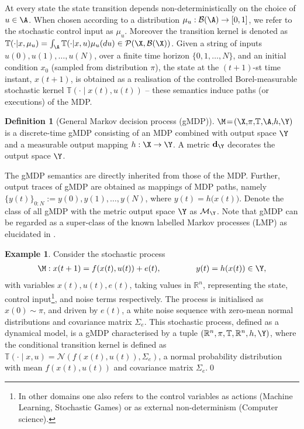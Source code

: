 \documentclass[letterpaper, 10 pt, conference]{amsart}
\theoremstyle{definition}
\newtheorem{defn}[definition]{Definition}
\theoremstyle{example}
\newtheorem{example}{Example}
\theoremstyle{remark}
\begin{document}
At every state the state transition depends non-deterministically on the choice of $u\in \A$.  
When chosen according to 
a distribution  $\mu_u:\mathcal{B}(\A)\rightarrow [0,1]$, we refer to the stochastic control input as $\mu_u$. Moreover   
the transition kernel is denoted as $\mathbb T(\cdot| x, \mu_u)=\int_\A \mathbb T(\cdot| x, u) \mu_u(du)\in \mathcal P(\X,\mathcal B(\X))$. 
Given a string of inputs $u(0), u(1), \ldots, u(N)$,  
over a finite time horizon $\{0,1,\ldots, N\}$, 
and an initial condition  $x_0$ (sampled from distribution $\pi$), 
the state at the $(t+1)$-st time instant, $x(t+1)$,
is obtained as a realisation of the controlled Borel-measurable stochastic kernel $\mathbb{T}\left(\cdot\mid x(t), u(t) \right)$ -- 
these semantics induce paths (or executions) of the MDP.   
\begin{defn}[General Markov decision process (gMDP)] 
$\M\!=\!(\X,\!\pi,\!\mathbb T,\!\A,\!h,\! \Y)$ is a discrete-time gMDP consisting of an MDP combined with output space $\Y$ and a measurable output mapping $h:\X\rightarrow\Y$.   
A metric $\mathbf d_\Y$ decorates the output space $\Y$.  \end{defn}
The gMDP semantics are directly inherited from those of the MDP. 
Further, output traces of gMDP are obtained as mappings of MDP paths, namely 
$\{y(t)\}_{0:N}:= y(0), y(1), \ldots, y(N)$, 
where $y(t) = h\big(x(t)\big)$. Denote the 
class of all gMDP with the metric output space $\Y$ as $\mathcal{M}_\Y$. Note that gMDP 
can be regarded as a super-class of the known labelled Markov processes (LMP) \cite{desharnais2004metrics} as elucidated in \cite{bcAKNP14}. 
\begin{example}\label{ex11}
Consider the stochastic process \begin{align*}\textstyle \M:  
x(t+1)=f(x(t),u(t))+ e(t),\hspace{1.5cm} y(t)=h(x(t))\in\Y,
\end{align*}
with variables $ x(t), u(t), e(t)$, 
taking values in $\mathbb R^n$, 
representing the state, control input\footnote{ In other domains one also refers to the control variables as actions (Machine Learning, Stochastic Games) or as external non-determinism (Computer science).}, and noise
terms respectively. 
The process is initialised as $x(0) \sim \pi$, 
and driven by $e(t)$, 
a white noise sequence with zero-mean normal distributions and covariance matrix $\Sigma_e$. This stochastic process, defined as a dynamical model, 
is a gMDP characterised by a tuple $(\mathbb R^n,\pi,\mathbb T,\mathbb R^n, h, \Y)$, 
where the conditional transition kernel is defined as $\mathbb T(\cdot\mid x,u)=\mathcal{N}\left(f(x(t),u(t)),\Sigma_e\right)$, 
a normal probability distribution with mean $f(x(t),u(t))$ and covariance matrix $\Sigma_e$.\qed
\end{example} 
\end{document}
